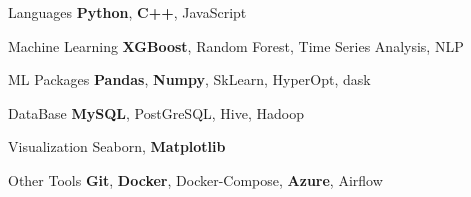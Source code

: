 
\begin{cvskills}
  \cvskill
    {Languages} %
    {\textbf{Python}, \textbf{C++}, JavaScript} %
    
  \cvskill
    {Machine Learning} %
    {\textbf{XGBoost}, Random Forest, Time Series Analysis, NLP} %
    
  \cvskill
    {ML Packages} %
    {\textbf{Pandas}, \textbf{Numpy}, SkLearn, HyperOpt, dask} %
    
  \cvskill
    {DataBase} %
    {\textbf{MySQL}, PostGreSQL, Hive, Hadoop} %
    
  \cvskill
    {Visualization} %
    {Seaborn, \textbf{Matplotlib}} %

  \cvskill
    {Other Tools} %
    {\textbf{Git}, \textbf{Docker}, Docker-Compose, \textbf{Azure}, Airflow} %
\end{cvskills}
